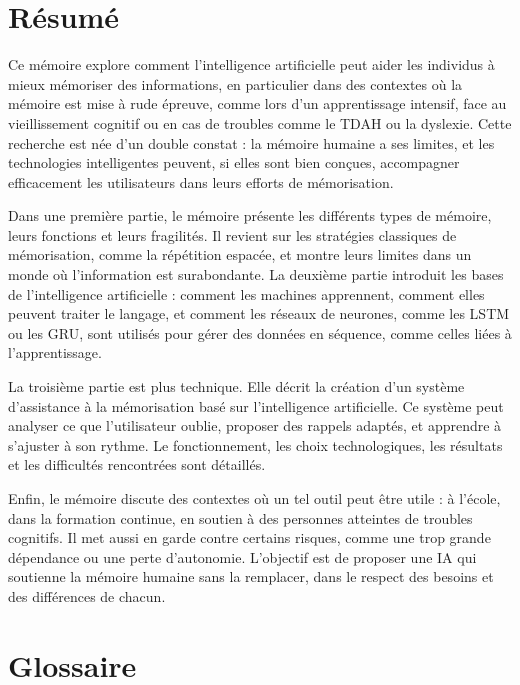 \documentclass[11pt,a4paper]{report}
\begin{document}
\chapter*{Résumé}

Ce mémoire explore comment l’intelligence artificielle peut aider les individus à mieux mémoriser des informations, en particulier dans des contextes où la mémoire est mise à rude épreuve, comme lors d’un apprentissage intensif, face au vieillissement cognitif ou en cas de troubles comme le TDAH ou la dyslexie. Cette recherche est née d’un double constat : la mémoire humaine a ses limites, et les technologies intelligentes peuvent, si elles sont bien conçues, accompagner efficacement les utilisateurs dans leurs efforts de mémorisation.

Dans une première partie, le mémoire présente les différents types de mémoire, leurs fonctions et leurs fragilités. Il revient sur les stratégies classiques de mémorisation, comme la répétition espacée, et montre leurs limites dans un monde où l’information est surabondante. La deuxième partie introduit les bases de l’intelligence artificielle : comment les machines apprennent, comment elles peuvent traiter le langage, et comment les réseaux de neurones, comme les LSTM ou les GRU, sont utilisés pour gérer des données en séquence, comme celles liées à l’apprentissage.

La troisième partie est plus technique. Elle décrit la création d’un système d’assistance à la mémorisation basé sur l’intelligence artificielle. Ce système peut analyser ce que l’utilisateur oublie, proposer des rappels adaptés, et apprendre à s’ajuster à son rythme. Le fonctionnement, les choix technologiques, les résultats et les difficultés rencontrées sont détaillés.

Enfin, le mémoire discute des contextes où un tel outil peut être utile : à l’école, dans la formation continue, en soutien à des personnes atteintes de troubles cognitifs. Il met aussi en garde contre certains risques, comme une trop grande dépendance ou une perte d’autonomie. L’objectif est de proposer une IA qui soutienne la mémoire humaine sans la remplacer, dans le respect des besoins et des différences de chacun.
\tableofcontents

\listoffigures

\chapter*{Glossaire}
\end{document}
